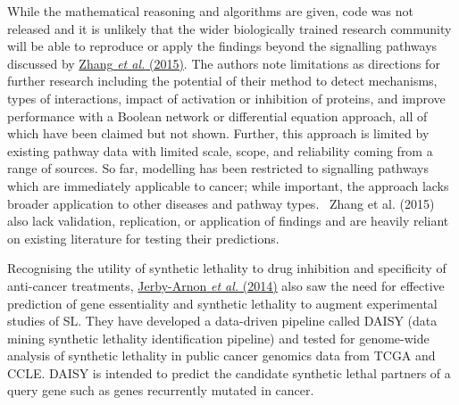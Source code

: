 While the mathematical reasoning and algorithms are given, code was not
released and it is unlikely that the wider biologically trained
research community will be able to reproduce or apply the findings
beyond the signalling pathways discussed by
\hyperlink{ENREF117}{Zhang}\hyperlink{ENREF117}{\textit{ et
al.}}\hyperlink{ENREF117}{ (2015)}. The authors note limitations as
directions for further research including the potential of their method
to detect mechanisms, types of interactions, impact of activation or
inhibition of proteins, and improve performance with a Boolean network
or differential equation approach, all of which have been claimed but
not shown. Further, this approach is limited by existing pathway data
with limited scale, scope, and reliability coming from a range of
sources. So far, modelling has been restricted to signalling pathways
which are immediately applicable to cancer; while important, the
approach lacks broader application to other diseases and pathway types.
\ Zhang et al. (2015) also lack validation, replication, or
application of findings and are heavily reliant on existing literature
for testing their predictions. 


Recognising the utility of synthetic lethality to drug inhibition and
specificity of anti-cancer treatments,
\hyperlink{ENREF53}{Jerby-Arnon}\hyperlink{ENREF53}{\textit{ et
al.}}\hyperlink{ENREF53}{ (2014)} also saw the need for effective
prediction of gene essentiality and synthetic lethality to augment
experimental studies of SL. They have developed a data-driven
pipeline called DAISY (data mining synthetic lethality identification
pipeline) and tested for genome-wide analysis of synthetic lethality in
public cancer genomics data from TCGA and CCLE. DAISY is intended to
predict the candidate synthetic lethal partners of a query gene such as
genes recurrently mutated in cancer. 


